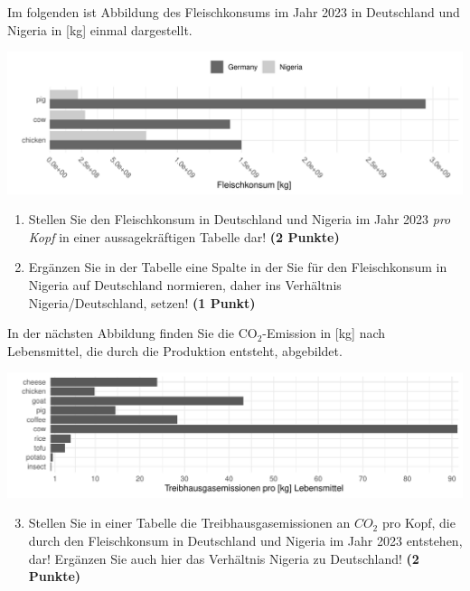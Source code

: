 \documentclass[a4paper, 9pt]{scrartcl}\usepackage[]{graphicx}\usepackage[]{xcolor}
\makeatletter
\def\maxwidth{ %
  \ifdim\Gin@nat@width>\linewidth
    \linewidth
  \else
    \Gin@nat@width
  \fi
}
\newenvironment{knitrout}{}{} %
\makeatother
\begin{document}
Im folgenden ist Abbildung des Fleischkonsums im Jahr 2023 in
Deutschland und Nigeria in [kg] einmal dargestellt. 

\begin{knitrout}
\color{fgcolor}

{\centering \includegraphics[width=\maxwidth]{img/math-14-a-1} 

}


\end{knitrout}
  
\begin{enumerate}
\item Stellen Sie den Fleischkonsum in Deutschland und Nigeria im Jahr
  2023 \textit{pro Kopf} in einer aussagekr{\"a}ftigen Tabelle dar! 
  \textbf{(2 Punkte)}
\item Erg{\"a}nzen Sie in der Tabelle eine Spalte in der Sie f{\"u}r den
  Fleischkonsum in Nigeria auf Deutschland normieren, daher ins Verh{\"a}ltnis
  Nigeria/Deutschland, setzen! \textbf{(1 Punkt)}
\end{enumerate}

In der n{\"a}chsten Abbildung finden Sie die CO$_2$-Emission in [kg] nach
Lebensmittel, die durch die Produktion entsteht, abgebildet.

\begin{knitrout}
\color{fgcolor}

{\centering \includegraphics[width=\maxwidth]{img/math-14-b-1} 

}


\end{knitrout}

\begin{enumerate}
  \setcounter{enumi}{2}  
\item Stellen Sie in einer Tabelle die Treibhausgasemissionen an $CO_2$ pro
  Kopf, die durch den Fleischkonsum in Deutschland und Nigeria im Jahr
  2023 entstehen, dar! Erg{\"a}nzen Sie auch hier das Verh{\"a}ltnis
  Nigeria zu Deutschland! \textbf{(2 Punkte)}
\end{enumerate}
\end{document}
